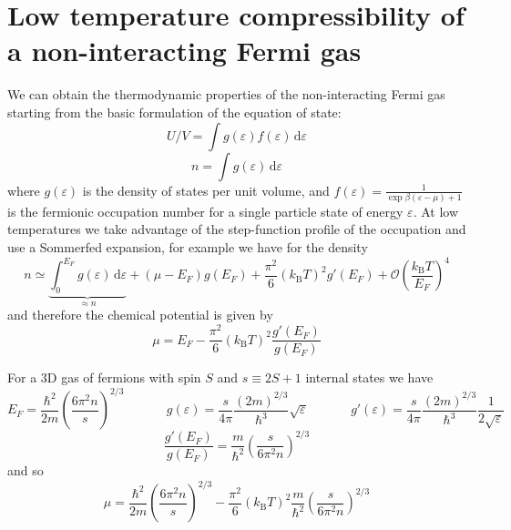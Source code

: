 \documentclass[11pt,letter]{article}
\newcommand{\kb}{\ensuremath{k_{\text{B}}}}
\begin{document}
\doublespacing
\section{ Low temperature compressibility of a non-interacting Fermi gas}

We can obtain the thermodynamic properties of the non-interacting Fermi gas
starting from the basic formulation of the equation of state:
\begin{equation} 
  U/V = \int g(\varepsilon) f(\varepsilon) \,\mathrm{d}\varepsilon
\end{equation}
\begin{equation}
  n = \int g(\varepsilon)  \,\mathrm{d}\varepsilon
\end{equation}
where $g(\varepsilon)$ is the density of states per unit volume, and
$f(\varepsilon) = \frac{1}{ \exp{\beta(\varepsilon-\mu)} + 1 }$ is the
fermionic occupation number for a single particle state of energy
$\varepsilon$.  At low temperatures we take advantage of the step-function
profile of the occupation and use a Sommerfed expansion, for example we have
for the density
\begin{equation}
  n \simeq 
\underbrace{ \int_{0}^{E_{F}} g(\varepsilon) \,\mathrm{d}\varepsilon }_{\approx n } 
   +  ( \mu - E_{F} ) g(E_{F})  + \frac{\pi^{2}}{6} ( \kb T)^{2} 
      g'(E_{F}) + 
       \mathcal{O}\left( \frac{ \kb T }{E_{F}} \right)^{4}
\end{equation}
and therefore the chemical potential is given by 
\begin{equation}
\mu = E_{F} - \frac{\pi^{2}}{6} ( \kb T)^{2} \frac{ g'(E_{F}) }{ g(E_{F}) }
\end{equation} 

For a 3D gas of fermions with spin $S$ and $s\equiv 2S+1$ internal states we have
\begin{equation} 
  E_{F}  = \frac{\hbar^{2}}{ 2m} \left(  \frac{ 6\pi^{2} n }{ s } \right)^{2/3}
  ~~~~~~~~~~~~~~~ 
  g(\varepsilon) =  \frac{s}{4\pi}  
             \frac{ (2m)^{2/3} }{\hbar^{3}} \sqrt{\varepsilon}
  ~~~~~~~~~~~~~~~
  g'(\varepsilon) =  \frac{s}{4\pi}  
             \frac{ (2m)^{2/3} }{\hbar^{3}} \frac{1}{2\sqrt{\varepsilon}}
\end{equation}
\begin{equation}
 \frac{ g'(E_{F}) }{ g(E_{F}) } = \frac{m}{\hbar^{2} } 
   \left( \frac{s}{ 6\pi^{2} n } \right)^{2/3} 
\end{equation} 
and so 
\begin{equation}
  \mu  = \frac{\hbar^{2}}{2m} \left( \frac{ 6\pi^{2} n }{s}  \right)^{2/3} 
    -  \frac{\pi^{2}}{6} (\kb T)^{2} \frac{m}{\hbar^{2}} 
       \left( \frac{s}{6\pi^{2}n} \right)^{2/3}
\end{equation}
\end{document}

